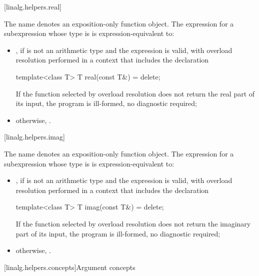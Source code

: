 [linalg.helpers.real]{}

\pnum
The name  denotes an exposition-only function object.
The expression  for a subexpression 
whose type is  is expression-equivalent to:
\begin{itemize}
\item
{},
if  is not an arithmetic type and
the expression  is valid,
with overload resolution performed in a context that includes the declaration
\begin{codeblock}
template<class T> T real(const T&) = delete;
\end{codeblock}
If the function selected by overload resolution
does not return the real part of its input,
the program is ill-formed, no diagnostic required;
\item
otherwise, .
\end{itemize}

[linalg.helpers.imag]{}

\pnum
The name  denotes an exposition-only function object.
The expression  for a subexpression 
whose type is  is expression-equivalent to:
\begin{itemize}
\item
{},
if  is not an arithmetic type and the expression 
is valid, with overload resolution performed in a context
that includes the declaration
\begin{codeblock}
template<class T> T imag(const T&) = delete;
\end{codeblock}
If the function selected by overload resolution
does not return the imaginary part of its input,
the program is ill-formed, no diagnostic required;
\item
otherwise, .
\end{itemize}

[linalg.helpers.concepts]{Argument concepts}

